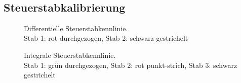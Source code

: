     \ \\    


    \subsection{Steuerstabkalibrierung}
		\begin{figure}[hp]
				\centering
				\captionsetup{justification=centering}
				\scalebox{0.6}{
					
				}
				\caption{Differentielle Steuerstabkennlinie. \\
				Stab 1: rot durchgezogen, Stab 2: schwarz gestrichelt}
				\label{exp:diffSSKL}
		\end{figure}
		
		\begin{figure}[hp]
						\centering
						\captionsetup{justification=centering}
						\scalebox{0.6}{
							
						}
						\caption{Integrale Steuerstabkennlinie. \\
						Stab 1: grün durchgezogen, Stab 2: rot punkt-strich, Stab 3: schwarz gestrichelt}
						\label{exp:intSSKL}
		\end{figure}
			
	
